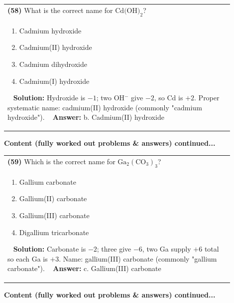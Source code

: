 \documentclass{article}
\begin{document}
{\begin{tabular}{|p{0.9\linewidth}|}
\hline
\vspace{0.2cm}
\textbf{(58)} What is the correct name for $\text{Cd(OH)}_2$? \\
\begin{minipage}[t]{0.85\linewidth}
\begin{enumerate}[label=\alph*.]
\item Cadmium hydroxide \
\item Cadmium(II) hydroxide \
\item Cadmium dihydroxide \
\item Cadmium(I) hydroxide
\end{enumerate}
\end{minipage}\
\hline
\vspace{0.2cm}
\textbf{Solution:} Hydroxide is $-1$; two OH$^-$ give $-2$, so Cd is $+2$. Proper systematic name: cadmium(II) hydroxide (commonly "cadmium hydroxide"). \
\hline
\vspace{0.2cm}
\textbf{Answer:} b. Cadmium(II) hydroxide \
\hline
\end{tabular}
\newpage
\noindent
{\large\textbf{Content (fully worked out problems & answers) continued...}}\\[0.2em]
\begin{tabular}{|p{0.9\linewidth}|}
\hline
\vspace{0.2cm}
\textbf{(59)} Which is the correct name for $\text{Ga}_2(\text{CO}_3)_3$? \\
\begin{minipage}[t]{0.85\linewidth}
\begin{enumerate}[label=\alph*.]
\item Gallium carbonate \
\item Gallium(II) carbonate \
\item Gallium(III) carbonate \
\item Digallium tricarbonate
\end{enumerate}
\end{minipage}\
\hline
\vspace{0.2cm}
\textbf{Solution:} Carbonate is $-2$; three give $-6$, two Ga supply $+6$ total so each Ga is $+3$. Name: gallium(III) carbonate (commonly "gallium carbonate"). \
\hline
\vspace{0.2cm}
\textbf{Answer:} c. Gallium(III) carbonate \
\hline
\end{tabular}
\newpage
\noindent
{\large\textbf{Content (fully worked out problems & answers) continued...}}\\[0.2em]
}
\end{document}
